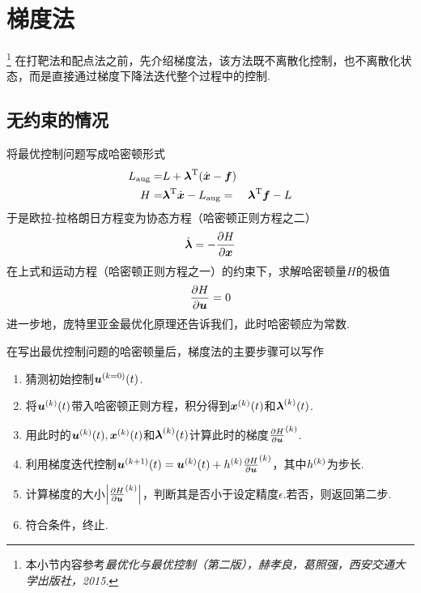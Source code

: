 \documentclass[UTF8]{article}
\numberwithin{equation}{section}
\begin{document}
    \section{梯度法}\footnote{本小节内容参考\textit{最优化与最优控制（第二版），赫孝良，葛照强，西安交通大学出版社，2015}.}
        在打靶法和配点法之前，先介绍梯度法，该方法既不离散化控制，也不离散化状态，而是直接通过梯度下降法迭代整个过程中的控制.
        \subsection{无约束的情况}
            将最优控制问题写成哈密顿形式
            \begin{align}
                L_\text{aug}=&L+\vb*{\lambda}^\text{T}\pqty{\dot{\vb*{x}}-\vb*{f}}\\
                H=&\vb*{\lambda}^\text{T}\dot{\vb*{x}}-L_\text{aug}
                =&\vb*{\lambda}^\text{T}\vb*{f}-L
            \end{align}
            于是欧拉-拉格朗日方程变为协态方程（哈密顿正则方程之二）
            \begin{align}
                \dot{\vb*{\lambda}}=-\pdv{H}{\vb*{x}}
            \end{align}
            在上式和运动方程（哈密顿正则方程之一）的约束下，求解哈密顿量$H$的极值
            \begin{align}
                \pdv{H}{\vb*{u}}=0
            \end{align}
            进一步地，庞特里亚金最优化原理还告诉我们，此时哈密顿应为常数.
            \par
            在写出最优控制问题的哈密顿量后，梯度法的主要步骤可以写作
            \begin{enumerate}
                \item 猜测初始控制$\vb*{u}^\pqty{k=0}\pqty{t}$.
                \item 将$\vb*{u}^\pqty{k}\pqty{t}$带入哈密顿正则方程，积分得到$\vb*{x}^\pqty{k}\pqty{t}$和$\vb*{\lambda}^\pqty{k}\pqty{t}$.
                \item 用此时的$\vb*{u}^\pqty{k}\pqty{t},\vb*{x}^\pqty{k}\pqty{t}$和$\vb*{\lambda}^\pqty{k}\pqty{t}$计算此时的梯度$\pdv{H}{\vb*{u}}^\pqty{k}$.
                \item 利用梯度迭代控制$\vb*{u}^\pqty{k+1}\pqty{t}=\vb*{u}^\pqty{k}\pqty{t}+h^\pqty{k}\pdv{H}{\vb*{u}}^\pqty{k}$，其中$h^\pqty{k}$为步长.
                \item 计算梯度的大小$\abs{\pdv{H}{\vb*{u}}^\pqty{k}}$，判断其是否小于设定精度$\epsilon$.若否，则返回第二步.
                \item 符合条件，终止.
            \end{enumerate}
\end{document}
